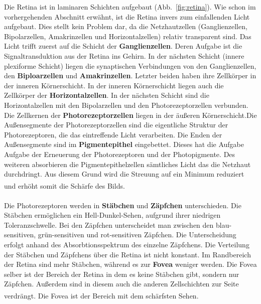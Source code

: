 \documentclass[12pt,a4paper,pdftex]{article}
\begin{document}
Die Retina ist in laminaren Schichten aufgebaut (Abb.~\ref{fig:retina}).
Wie schon im vorhergehenden Abschnitt erwähnt, ist die Retina invers zum einfallenden Licht aufgebaut. Dies stellt kein Problem dar, da die Netzhautzellen (Ganglienzellen, Bipolarzellen, Amakrinzellen und Horizontalzellen) relativ transparent sind. Das Licht trifft zuerst auf die Schicht der \textbf{Ganglienzellen}.  Deren Aufgabe ist die Signaltransduktion aus der Retina ins Gehirn. In der nächsten Schicht (innere plexiforme Schicht) liegen die synaptischen Verbindungen von den Ganglienzellen, den \textbf{Biploarzellen}  und \textbf{Amakrinzellen}.  Letzter beiden haben ihre Zellkörper in der inneren Körnerschicht. In der inneren Körnerschicht liegen auch die Zellkörper der \textbf{Horizontalzellen}.  In der nächsten Schicht sind die Horizontalzellen mit den Bipolarzellen und den Photorezeptorzellen verbunden. Die Zellkernen der \textbf{Photorezeptorzellen}  liegen in der äußeren Körnerschicht.Die Außensegmente der Photorezeptorzellen sind die eigentliche Struktur der Photorezeptoren, die das eintreffende Licht verarbeiten. Die Enden der Außensegmente sind im \textbf{Pigmentepithel}  eingebettet. Dieses hat die Aufgabe Aufgabe der Erneuerung der Photorezeptoren und der Photopigmente. Des weiteren absorbieren die Pigmentepithelzellen sämtliches Licht das die Netzhaut durchdringt. Aus diesem Grund wird die Streuung auf ein Minimum reduziert und erhöht somit die Schärfe des Bilds. \textsuperscript{\cite[10]{neurowissenschaften_baer}}
\\
\\
Die Photorezeptoren werden in \textbf{Stäbchen}  und \textbf{Zäpfchen}  unterschieden. Die Stäbchen ermöglichen ein Hell-Dunkel-Sehen, aufgrund ihrer niedrigen Toleranzschwelle. Bei den Zäpfchen unterscheidet man zwischen den blau-sensitiven, grün-sensitiven und rot-sensitiven Zäpfchen. Die Unterscheidung erfolgt anhand des Absorbtionsspektrum des einzelne Zäpfchens. Die Verteilung der Stäbchen und Zäpfchens über die Retina ist nicht konstant. Im Randbereich der Retina sind mehr Stäbchen, während es zur \textbf{Fovea}  weniger werden. Die Fovea selber ist der Bereich der Retina in dem es keine Stäbchen gibt, sondern nur Zäpfchen. Außerdem sind in diesem auch die anderen Zellschichten zur Seite verdrängt. Die Fovea ist der Bereich mit dem schärfsten Sehen. \textsuperscript{\cite[10]{neurowissenschaften_baer}}
\end{document}
